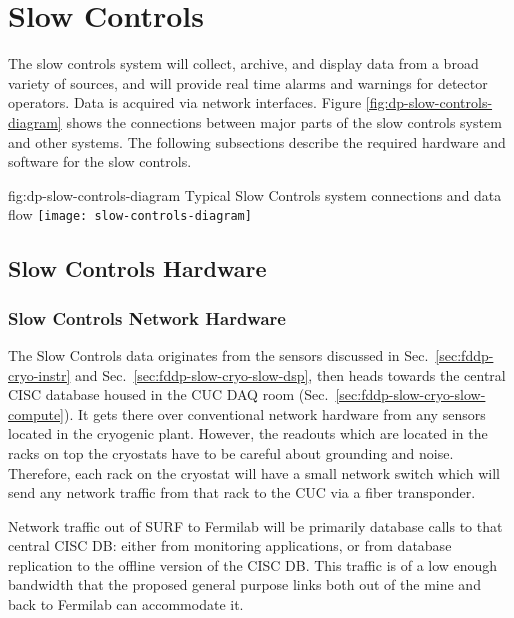 \section{Slow Controls}
\label{sec:fddp-slow-cryo-ctrl}


The slow controls system will collect, archive, and display data from
a broad variety of sources, and will provide real time alarms and
warnings for detector operators. Data is acquired via network
interfaces.  Figure \ref{fig:dp-slow-controls-diagram} shows the
connections between major parts of the slow controls system and other
systems.  The following subsections describe the required hardware and
software for the slow controls.

\begin{dunefigure}{fig:dp-slow-controls-diagram}
{Typical Slow Controls system connections and data flow}
\texttt{[image: slow-controls-diagram]}
\end{dunefigure}




\subsection{Slow Controls Hardware}
\label{sec:fddp-slow-cryo-hdwr}

\subsubsection{Slow Controls Network Hardware}
\label{sec:fddp-slow-cryo-slow-network}
The Slow Controls data originates from the sensors discussed in
Sec.~\ref{sec:fddp-cryo-instr} and
Sec.~\ref{sec:fddp-slow-cryo-slow-dsp}, then heads towards the central
CISC database housed in the CUC DAQ room
(Sec.~\ref{sec:fddp-slow-cryo-slow-compute}).  It gets there over
conventional network hardware from any sensors located in the cryogenic
plant.  However, the readouts which are located in the racks on top the
cryostats have to be careful about grounding and noise.  Therefore, each
rack on the cryostat will have a small network switch which will send
any network traffic from that rack to the CUC via a fiber transponder.

Network traffic out of SURF to Fermilab will be primarily database calls
to that central CISC DB: either from monitoring applications, or from
database replication to the offline version of the CISC DB.  This
traffic is of a low enough bandwidth that the proposed general purpose
links both out of the mine and back to Fermilab can accommodate it.

